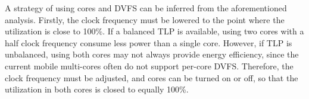 A strategy of using cores and DVFS can be inferred from the aforementioned analysis.
Firstly, the clock frequency must be lowered to the point where the utilization is close to 100\%.
If a balanced TLP is available, using two cores with a half clock frequency consume less power than
a single core. However, if TLP is unbalanced, using both cores may not always provide energy
efficiency, since the current mobile multi-cores often do not support per-core DVFS. Therefore,
the clock frequency must be adjusted, and cores can be turned on or off, so that
the utilization in both cores is closed to equally 100\%.




